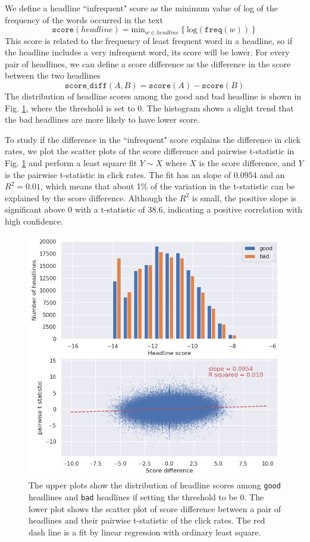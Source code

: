 \documentclass[%
preprint,
 amsmath,amssymb,
 aps,
]{revtex4-2}
\begin{document}
We define a headline ``infrequent" score as the minimum value of log of the frequency of the words occurred in the text
\begin{equation}
    \texttt{score}(headline) = \mathrm{min}_{w\in headline}\left\{\mathrm{log}(\texttt{freq}(w))\right\}
\end{equation}
This score is related to the frequency of least frequent word in a headline, so if the headline includes a very infrequent word, its score will be lower.
For every pair of headlines, we can define a score difference as the difference in the score between the two headlines
\begin{equation}
    \texttt{score\_diff}(A, B) = \texttt{score}(A) - \texttt{score}(B)
\end{equation}
The distribution of headline scores among the good and bad headline is shown in Fig. \ref{fig:score_diff}, where the threshold is set to 0.
The histogram shows a slight trend that the bad headlines are more likely to have lower score.

To study if the difference in the ``infrequent" score explains the difference in click rates, we plot the scatter plots of the score difference and pairwise t-statistic in Fig. \ref{fig:score_diff} and perform a least square fit \(Y \sim X\) where \(X\) is the score difference, and \(Y\) is the pairwise t-statistic in click rates.
The fit has an slope of \(0.0954\) and an \(R^2 = 0.01\), which means that about 1\% of the variation in the t-statistic can be explained by the score difference.
Although the \(R^2\) is small, the positive slope is significant above 0 with a t-statistic of 38.6, indicating a positive correlation with high confidence.

\begin{figure}
    \centering
    \includegraphics[width=0.8\linewidth]{fig/score_diff.png}
    \caption{The upper plots show the distribution of headline scores among \texttt{good} headlines and \texttt{bad} headlines if setting the threshold to be 0. The lower plot shows the scatter plot of score difference between a pair of headlines and their pairwise t-statistic of the click rates. The red dash line is a fit by linear regression with ordinary least square.}
    \label{fig:score_diff}
\end{figure}
\end{document}

